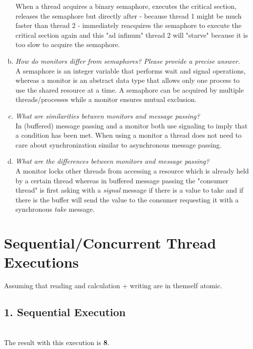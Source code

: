 \documentclass{report}
\begin{document}
\begin{enumerate}[a)]
			When a thread acquires a binary semaphore, executes the critical section, releases the semaphore but directly after - because thread 1 might be much faster than thread 2 - immediately reacquires the semaphore to execute the critical section again and this "ad infinum" thread 2 will "starve" because it is too slow to acquire the semaphore.
			\item \textit{How do monitors differ from semaphores? Please provide a precise answer.} \\
			A semaphore is an integer variable that performs wait and signal operations, whereas a monitor is an abstract data type that allows only one process to use the shared resource at a time. A semaphore can be acquired by multiple threads/processes while a monitor ensures mutual exclusion.
			\item \textit{What are similarities between monitors and message passing?} \\
			In (buffered) message passing and a monitor both use signaling to imply that a condition has been met. When using a monitor a thread does not need to care about synchronization similar to asynchronous message passing.
			\item \textit{What are the differences between monitors and message passing?} \\
			A monitor locks other threads from accessing a resource which is already held by a certain thread whereas in buffered message passing the "consumer thread" is first asking with a \textit{signal} message if there is a value to take and if there is the buffer will send the value to the consumer requesting it with a synchronous \textit{take} message.
		\end{enumerate}
	\closesection
	
	\newpage
	
	\section{Sequential/Concurrent Thread Executions}
	\startsection
		Assuming that reading and calculation + writing are in themself atomic.
		\subsection{1. Sequential Execution}
		\startsubsection
			\hfill \\
			The result with this execution is \textbf{8}.
		\closesection
\end{document}
